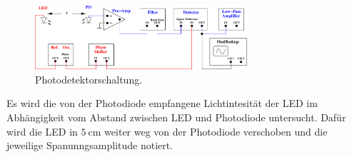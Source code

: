 \begin{figure}[H]
    \centering
    \includegraphics[width=0.7\textwidth]{build/Abb_5.pdf}
    \caption {Photodetektorschaltung.\cite{V303}}
    \label{fig:Abb_5}
\end{figure}
Es wird die von der Photodiode empfangene Lichtintesität der LED im Abhängigkeit vom Abstand zwischen LED und Photodiode untersucht.
Dafür wird die LED in $\qty{5}{\centi\meter}$ weiter weg von der Photodiode verschoben und die jeweilige Spanunngsamplitude notiert.

